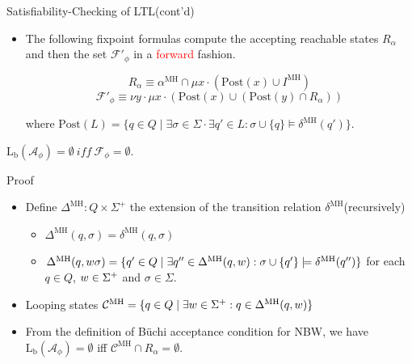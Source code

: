 \documentclass[12pt]{beamer}
\begin{document}
\begin{frame}{Satisfiability-Checking of LTL(cont'd)}
	\begin{itemize}
		\item The following fixpoint formulas compute the accepting reachable states $R_{\alpha}$ and then the set $\mathcal{F}'_{\phi}$ in a \textcolor{red}{forward} fashion.

		$$R_{\alpha} \equiv \alpha^{\text{MH}} \cap \mu x \cdot (\text{Post}(x) \cup I^{\text{MH}})$$
		$$\mathcal{F}'_{\phi} \equiv \nu y \cdot \mu x \cdot (\text{Post}(x) \cup (\text{Post}(y) \cap R_{\alpha})) $$
		
		where $\text{Post}(L) = \{q \in Q \mid \exists \sigma \in \Sigma \cdot \exists q' \in L : \sigma \cup \{q\} \models \delta^{\text{MH}}(q')\}$.
	\end{itemize}
	\begin{theorem}
		$\text{L}_{\text{b}}(\mathcal{A}_{\phi}) = \emptyset ~ iff ~ \mathcal{F}_{\phi} = \emptyset$.
	\end{theorem}
\end{frame}

\begin{frame}{Proof}
	\begin{itemize}
		\item Define $\Delta^{\text{MH}} : Q \times \Sigma^{+}$ the extension of the transition relation $\delta^{\text{MH}}$(recursively)
		\begin{itemize}
			\item $\Delta^{\text{MH}}(q, \sigma) = \delta^{\text{MH}}(q, \sigma)$
			\item $\Delta^{\text{MH}}(q, \mathnormal{w}\sigma) = \{q' \in Q \mid \exists q'' \in \Delta^{\text{MH}}(q, \mathnormal{w}) : \sigma \cup \{q'\} \models \delta^{\text{MH}}(q'')\}$ for each $q \in Q$, $\mathnormal{w} \in \Sigma^{+}$ and $\sigma \in \Sigma$.
		\end{itemize}
		\item Looping states $\mathcal{C}^{\text{MH}} = \{q \in Q \mid \exists \mathnormal{w} \in \Sigma^{+} : q \in \Delta^{\text{MH}}(q,\mathnormal{w})\}$
		\item From the definition of Büchi acceptance condition for NBW, we have $\text{L}_{\text{b}}(\mathcal{A}_{\phi}) = \emptyset$ iff $\mathcal{C}^{\text{MH}} \cap R_{\alpha} = \emptyset$.
	\end{itemize}
\end{frame}
\end{document}
